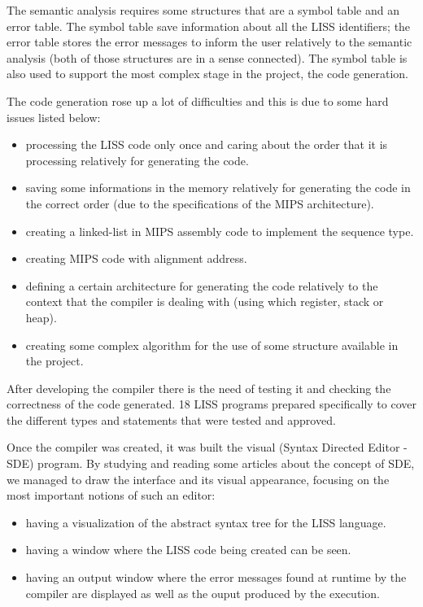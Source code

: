 \documentclass[
  oneside,
  11pt, a4paper,
  footinclude=true,
  headinclude=true,
  cleardoublepage=empty
]{scrbook}
\begin{document}
The semantic analysis requires some structures that are a symbol table and an error table.
The symbol table save information about all the LISS identifiers; the error table stores the error messages to inform the user relatively to the semantic analysis (both of those structures are in a sense connected). The symbol table is also used to support the most complex stage in the project, the code generation.

The code generation rose up a lot of difficulties and this is due to some hard issues listed below:
\begin{itemize}
\item processing the LISS code only once and caring about the order that it is processing relatively for generating the code.
\item saving some informations in the memory relatively for generating the code in the correct order (due to the specifications of the MIPS architecture).
\item creating a linked-list in MIPS assembly code to implement the sequence type.
\item creating MIPS code with alignment address.
\item defining a certain architecture for generating the code relatively to the context that the compiler is dealing with (using which register, stack or heap).
\item creating some complex algorithm for the use of some structure available in the project.
\end{itemize}

After developing the compiler there is the need of testing it and checking the correctness of the code generated. 18 LISS programs prepared specifically to cover the different types and statements that were tested and approved.

Once the compiler was created, it was built the visual  (Syntax Directed Editor - SDE) program. By studying and reading some articles about the concept of SDE, we managed to draw the interface and its visual appearance, focusing on the most important notions of such an editor:

\begin{itemize}
\item having a visualization of the abstract syntax tree for the LISS language.
\item having a window where the LISS code being created can be seen.
\item having an output window where the error messages found at runtime by the compiler are displayed as well as the ouput produced by the execution.
\end{itemize}
\end{document}
